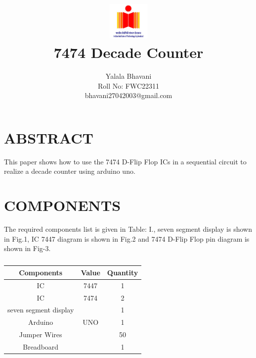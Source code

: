\documentclass[conference]{IEEEtran}
\title{
\vspace{1cm}
{\includegraphics[width=0.15\textwidth]{1.jpg} \\ 7474 Decade Counter} }
\author{Yalala Bhavani \\ Roll No: FWC22311 \\ bhavani27042003@gmail.com}
\begin{document}
\maketitle
 \section {ABSTRACT}
 This paper shows how to use the 7474 D-Flip Flop ICs in a sequential circuit to realize a decade counter using arduino uno.

\section{COMPONENTS}
The required components list is given in Table: I., seven segment display is shown in Fig.1, IC 7447 diagram is shown in Fig.2 and 7474 D-Flip Flop pin diagram is shown in Fig-3.
\vspace{0.3cm}
 \begin{table} [htbp]
\centering
\begin{tabular}{| c | c | c |} \hline
Components & Value & Quantity \\\hline
IC & 7447 & 1 \\ \hline
IC & 7474 & 2 \\ \hline
seven segment display & & 1\\ \hline
Arduino & UNO & 1 \\ \hline
Jumper Wires &  & 50 \\ \hline
Breadboard & & 1 \\ 
\hline
\end{tabular}
\vspace{0.3cm}
\caption{\label{tab:widgets}}
\end{table}
\end{document}
